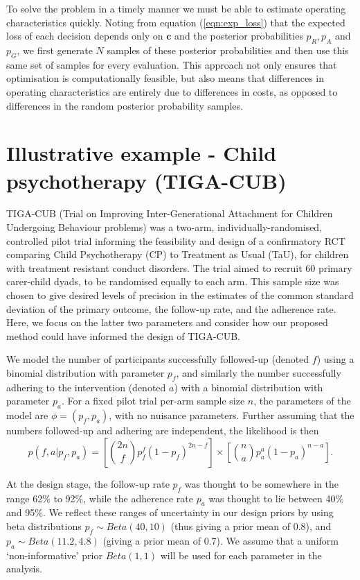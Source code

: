\documentclass[AMA,STIX1COL]{WileyNJD-v2}
\begin{document}
To solve the problem in a timely manner we must be able to estimate operating characteristics quickly. Noting from equation (\ref{eqn:exp_loss}) that the expected loss of each decision depends only on $\mathbf{c}$ and the posterior probabilities $p_R, p_A$ and $p_G$, we first generate $N$ samples of these posterior probabilities and then use this same set of samples for every evaluation. This approach not only ensures that optimisation is computationally feasible, but also means that differences in operating characteristics are entirely due to differences in costs, as opposed to differences in the random posterior probability samples.

\section{Illustrative example - Child psychotherapy (TIGA-CUB)}\label{sec:TIGA}

TIGA-CUB (Trial on Improving Inter-Generational Attachment for Children Undergoing Behaviour problems) was a two-arm, individually-randomised, controlled pilot trial informing the feasibility and design of a confirmatory RCT comparing Child Psychotherapy (CP) to Treatment as Usual (TaU), for children with treatment resistant conduct disorders. The trial aimed to recruit $60$ primary carer-child dyads, to be randomised equally to each arm. This sample size was chosen to give desired levels of precision in the estimates of the common standard deviation of the primary outcome, the follow-up rate, and the adherence rate. Here, we focus on the latter two parameters and consider how our proposed method could have informed the design of TIGA-CUB.

We model the number of participants successfully followed-up (denoted $f$) using a binomial distribution with parameter $p_f$, and similarly the number successfully adhering to the intervention (denoted $a$) with a binomial distribution with parameter $p_a$. For a fixed pilot trial per-arm sample size $n$, the parameters of the model are $\phi = (p_f, p_a)$, with no nuisance parameters. Further assuming that the numbers followed-up and adhering are independent, the likelihood is then 
$$
p(f, a | p_f, p_a) = \left[{2n \choose f}p_f^{f}(1-p_f)^{2n-f}\right] \times \left[{n \choose a}p_a^{a}(1-p_a)^{n-a}\right].
$$

At the design stage, the follow-up rate $p_f$ was thought to be somewhere in the range 62\% to 92\%, while the adherence rate $p_a$ was thought to lie between 40\% and 95\%. We reflect these ranges of uncertainty in our design priors by using beta distributions $p_f \sim Beta(40, 10)$ (thus giving a prior mean of 0.8), and $p_a \sim Beta(11.2, 4.8)$ (giving a prior mean of 0.7). We assume that a uniform `non-informative' prior $Beta(1,1)$ will be used for each parameter in the analysis.
\end{document}
